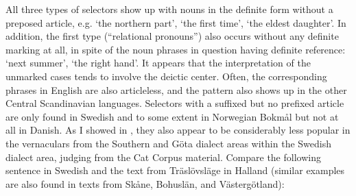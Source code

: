 All three types of selectors show up with nouns in the definite form without a preposed article, e.g.  ‘the northern part’,  ‘the first time’,  ‘the eldest daughter’. In addition, the first type (“relational pronouns”) also occurs without any definite marking at all, in spite of the noun phrases in question having definite reference:  ‘next summer’,  ‘the right hand’. It appears that the interpretation of the unmarked cases tends to involve the deictic center. Often, the corresponding phrases in English are also articleless, and the pattern also shows up in the other Central Scandinavian languages. Selectors with a suffixed but no prefixed article are only found in Swedish and to some extent in Norwegian Bokmål but not at all in Danish. As I showed in \citet{Dahl2003}, they also appear to be considerably less popular in the vernaculars from the Southern and Göta dialect areas within the Swedish dialect area, judging from the Cat Corpus material. Compare the following sentence in Swedish and the text from Träslövsläge in Halland (similar examples are also found in texts from Skåne, Bohuslän, and Västergötland):

\ea\label{}
\z
\z 

